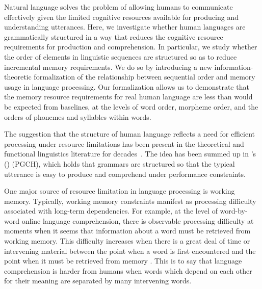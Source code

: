 
Natural language solves the problem of allowing humans to communicate effectively given the limited cognitive resources available for producing and understanding utterances. Here, we investigate whether human languages are grammatically structured in a way that reduces the cognitive resource requirements for production and comprehension. In particular, we study whether the order of elements in linguistic sequences are structured so as to reduce incremental memory requirements. We do so by introducing a new information-theoretic formalization of the relationship between sequential order and memory usage in language processing. Our formalization allows us to demonstrate that the memory resource requirements for real human language are less than would be expected from baselines, at the levels of word order, morpheme order, and the orders of phonemes and syllables within words. 

The suggestion that the structure of human language reflects a need for efficient processing under resource limitations has been present in the theoretical and functional linguistics literature for decades~\citep{yngve1961,berwick1984grammatical,hawkins1994performance,jaeger2011language,chomsky2005three,gibson2019efficiency}. The idea has been summed up in \citeauthor{hawkins1994efficiency}'s (\citeyear{hawkins1994efficiency})  (PGCH), which holds that grammars are structured so that the typical utterance is easy to produce and comprehend under performance constraints.

One major source of resource limitation in language processing is working memory. Typically, working memory constraints manifest as processing difficulty associated with long-term dependencies.
For example, at the level of word-by-word online language comprehension, there is observable processing difficulty at moments when it seems that information about a word must be retrieved from working memory. This difficulty increases when there is a great deal of time or intervening material between the point when a word is first encountered and the point when it must be retrieved from memory  \citep{gibson1998syntactic,gibson1999memory,gibson2000dependency,mcelree,lewis2005activationbased,bartek2011search,nicenboim2015working}. 
This is to say that language comprehension is harder from humans when words which depend on each other for their meaning are separated by many intervening words.


